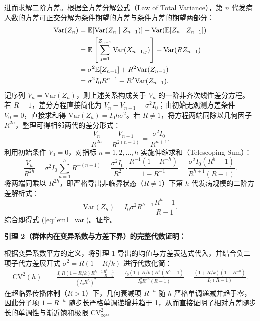 \documentclass[11pt,a4paper]{article}
\theoremstyle{plain}
\theoremstyle{definition}
\begin{document}
进而求解二阶方差。根据全方差分解公式（Law of Total Variance），第 $n$ 代发病人数的方差可正交分解为条件期望的方差与条件方差的期望两部分：
\begin{align}
\text{Var}(Z_n) &= \mathbb{E}[\text{Var}(Z_n \mid Z_{n-1})] + \text{Var}(\mathbb{E}[Z_n \mid Z_{n-1}]) \notag \\
&= \mathbb{E}\left[\sum_{j=1}^{Z_{n-1}} \text{Var}(X_{n-1, j})\right] + \text{Var}(R Z_{n-1}) \notag \\
&= \sigma^2 \mathbb{E}[Z_{n-1}] + R^2 \text{Var}(Z_{n-1}) \notag \\
&= \sigma^2 I_0 R^{n-1} + R^2 \text{Var}(Z_{n-1}).
\end{align}
记序列 $V_n = \text{Var}(Z_n)$，则上述关系构成关于 $V_n$ 的一阶非齐次线性差分方程。若 $R=1$，差分方程直接简化为 $V_n - V_{n-1} = \sigma^2 I_0$；由初始无观测方差条件 $V_0 = 0$，直接求和得 $\text{Var}(Z_h) = I_0 h \sigma^2$。若 $R \neq 1$，将方程两端同除以几何因子 $R^{2n}$，整理可得相邻两代的差分形式：
\begin{equation}
\frac{V_n}{R^{2n}} - \frac{V_{n-1}}{R^{2(n-1)}} = \frac{\sigma^2 I_0}{R^{n+1}}.
\end{equation}
利用初始条件 $V_0 = 0$，对指标 $n = 1, 2, \dots, h$ 实施伸缩求和（Telescoping Sum）：
\begin{equation}
\frac{V_h}{R^{2h}} = \sigma^2 I_0 \sum_{n=1}^h R^{-(n+1)} = \frac{\sigma^2 I_0}{R^2} \cdot \frac{R^{-1}(1 - R^{-h})}{1 - R^{-1}} = \frac{\sigma^2 I_0 (R^h - 1)}{R^{h+1}(R - 1)}.
\end{equation}
将两端同乘以 $R^{2h}$，即严格导出非临界状态（$R \neq 1$）下第 $h$ 代发病规模的二阶方差解析式：
\begin{equation}
\text{Var}(Z_h) = I_0 \sigma^2 R^{h-1} \frac{R^h - 1}{R - 1}.
\end{equation}
综合即得式 (\ref{eq:lem1_var})。证毕。

\vspace{0.8em}
\noindent\textbf{引理 2（群体内在变异系数与方差下界）的完整代数证明：}

根据变异系数平方的定义，将引理 1 导出的均值与方差表达式代入，并结合负二项子代方差展开式 $\sigma^2 = R(1 + R/k)$ 进行代数化简：
\begin{align}
\text{CV}^2(h) &= \frac{I_0 R(1 + R/k) R^{h-1} \frac{R^h - 1}{R - 1}}{(I_0 R^h)^2} = \frac{I_0 (1 + R/k) R^h (R^h - 1)}{I_0^2 R^{2h} (R - 1)} = \frac{(1 + R/k)(1 - R^{-h})}{I_0(R - 1)}.
\end{align}
在超临界传播体制（$R > 1$）下，几何衰减项 $R^{-h}$ 随 $h$ 严格单调递减并趋于零，因此分子项 $1 - R^{-h}$ 随步长严格单调递增并趋于 1，从而直接证明了相对方差随步长的单调性与渐近饱和极限 $\text{CV}^2_\infty$。
\end{document}
